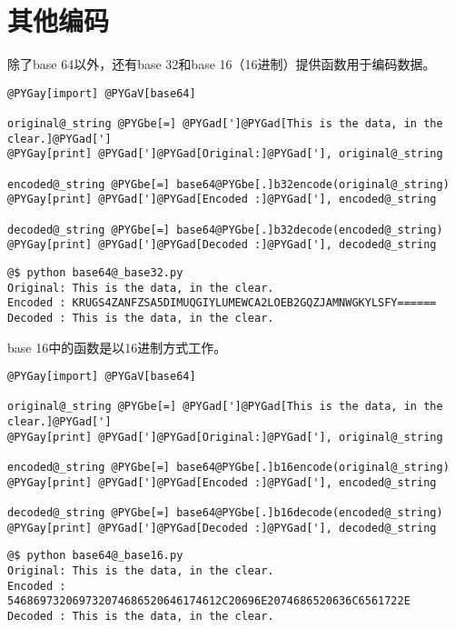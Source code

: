 \documentclass[a4paper,10pt,english]{manual}
\begin{document}
\section{其他编码}

除了base 64以外，还有base 32和base 16（16进制）提供函数用于编码数据。

\begin{Verbatim}[commandchars=@\[\]]
@PYGay[import] @PYGaV[base64]

original@_string @PYGbe[=] @PYGad[']@PYGad[This is the data, in the clear.]@PYGad[']
@PYGay[print] @PYGad[']@PYGad[Original:]@PYGad['], original@_string

encoded@_string @PYGbe[=] base64@PYGbe[.]b32encode(original@_string)
@PYGay[print] @PYGad[']@PYGad[Encoded :]@PYGad['], encoded@_string

decoded@_string @PYGbe[=] base64@PYGbe[.]b32decode(encoded@_string)
@PYGay[print] @PYGad[']@PYGad[Decoded :]@PYGad['], decoded@_string
\end{Verbatim}

\begin{Verbatim}[commandchars=@\[\]]
@$ python base64@_base32.py
Original: This is the data, in the clear.
Encoded : KRUGS4ZANFZSA5DIMUQGIYLUMEWCA2LOEB2GQZJAMNWGKYLSFY======
Decoded : This is the data, in the clear.
\end{Verbatim}

base 16中的函数是以16进制方式工作。

\begin{Verbatim}[commandchars=@\[\]]
@PYGay[import] @PYGaV[base64]

original@_string @PYGbe[=] @PYGad[']@PYGad[This is the data, in the clear.]@PYGad[']
@PYGay[print] @PYGad[']@PYGad[Original:]@PYGad['], original@_string

encoded@_string @PYGbe[=] base64@PYGbe[.]b16encode(original@_string)
@PYGay[print] @PYGad[']@PYGad[Encoded :]@PYGad['], encoded@_string

decoded@_string @PYGbe[=] base64@PYGbe[.]b16decode(encoded@_string)
@PYGay[print] @PYGad[']@PYGad[Decoded :]@PYGad['], decoded@_string
\end{Verbatim}

\begin{Verbatim}[commandchars=@\[\]]
@$ python base64@_base16.py
Original: This is the data, in the clear.
Encoded : 546869732069732074686520646174612C20696E2074686520636C6561722E
Decoded : This is the data, in the clear.
\end{Verbatim}
\end{document}
